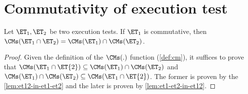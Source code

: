 \section{Commutativity of execution test}

\begin{theorem}
\label{thm:appendix-et-composition-1}
Let $\ET_1, \ET_2$ be two execution tests. If $\ET_1$ is commutative, 
then $\CMs(\ET_1 \cap \ET_2) = \CMs(\ET_1) \cap \CMs(\ET_2)$. 
\end{theorem}
\begin{proof}
Given the definition of the \( \CMs(.) \) function (\cref{def:cm}), it suffices to prove that \( \CMs(\ET_{1} \cap \ET{2}) \subseteq \CMs(\ET_1) \cap \CMs(\ET_2) \) and \( \CMs(\ET_1) \cap \CMs(\ET_2) \subseteq \CMs(\ET_{1} \cap \ET{2}) \).
The former is proven by the \cref{lem:et12-in-et1-et2} and the later is proven by \cref{lem:et1-et2-in-et12}.




\end{proof}
